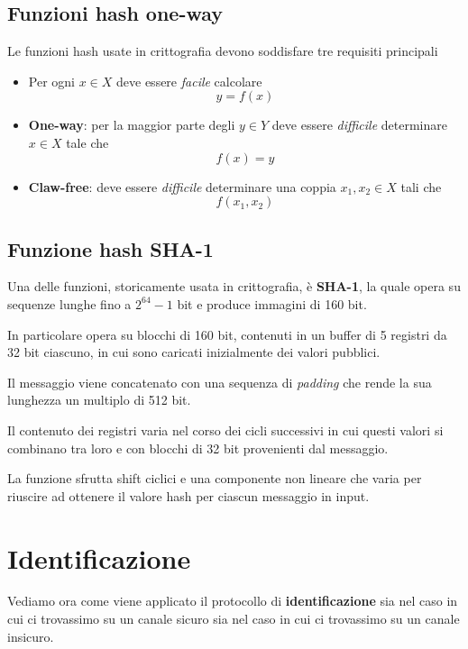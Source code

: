 \subsection{Funzioni hash one-way}
Le funzioni hash usate in crittografia devono soddisfare tre requisiti principali
\begin{itemize}
	\item Per ogni $x \in X$ deve essere \emph{facile} calcolare
	      \[ y = f(x) \]
	\item \textbf{One-way}: per la maggior parte degli $y \in Y$ deve essere \emph{difficile} determinare $x \in X$
	      tale che
	      \[ f(x) = y \]
	\item \textbf{Claw-free}: deve essere \emph{difficile} determinare una coppia $x_1, x_2 \in X$ tali che
	      \[ f(x_1, x_2) \]
\end{itemize}

\subsection{Funzione hash SHA-1}
Una delle funzioni, storicamente usata in crittografia, \`e \textbf{SHA-1}, la quale opera su sequenze lunghe fino
a $2^{64} - 1$ bit e produce immagini di 160 bit.

In particolare opera su blocchi di 160 bit, contenuti in un buffer di 5 registri da 32 bit ciascuno, in cui sono
caricati inizialmente dei valori pubblici.

Il messaggio viene concatenato con una sequenza di \emph{padding} che rende la sua lunghezza un multiplo di 512 bit.

Il contenuto dei registri varia nel corso dei cicli successivi in cui questi valori si combinano tra loro e con
blocchi di 32 bit provenienti dal messaggio.

La funzione sfrutta shift ciclici e una componente non lineare che varia per riuscire ad ottenere il valore hash per
ciascun messaggio in input.

\section{Identificazione}
Vediamo ora come viene applicato il protocollo di \textbf{identificazione} sia nel caso in cui ci trovassimo su un
canale sicuro sia nel caso in cui ci trovassimo su un canale insicuro.

